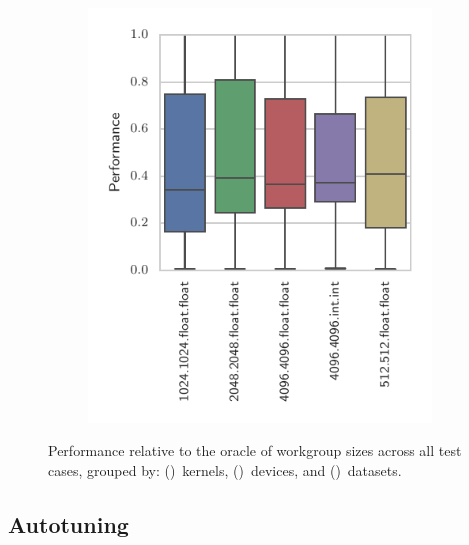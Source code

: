 \documentclass[nonatbib,preprint,10pt]{sigplanconf}
\begin{document}
\begin{figure}
\begin{subfigure}[h]{.48\columnwidth}
    \vspace{-1.5em} %
    \caption{}
    \label{fig:performance-devices}
  \end{subfigure}
  ~%
  \begin{subfigure}[h]{.48\columnwidth}
    \centering
    \includegraphics[width=\columnwidth]{img/performance_datasets.pdf}
    \vspace{-1.5em} %
    \caption{}
    \label{fig:performance-datasets}
  \end{subfigure}
  \caption[Workgroup size performances across device, kernel, and dataset]{%
    Performance relative to the oracle of workgroup sizes across all
    test cases, grouped by: ()~kernels,
    ()~devices, and
    ()~datasets.%
  }
  \label{fig:performances}
\end{figure}


\subsection{Autotuning}
\end{document}
